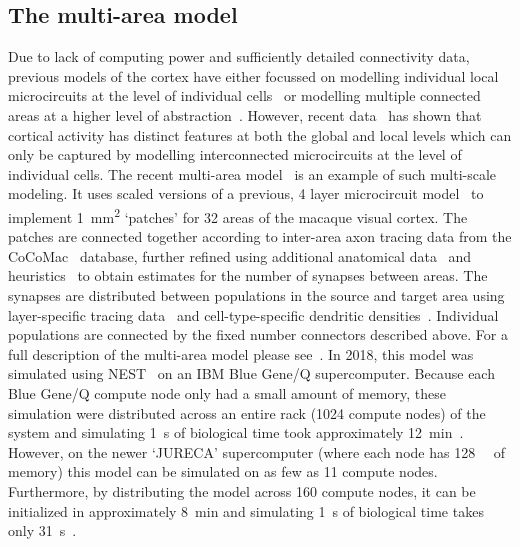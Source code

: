 \documentclass[9pt,a4paper]{amsart}
\begin{document}
\subsection{The multi-area model}
Due to lack of computing power and sufficiently detailed connectivity data, previous models of the cortex have either focussed on modelling individual local microcircuits at the level of individual cells~\citep{Izhikevich2008,Potjans2012} or modelling multiple connected areas at a higher level of abstraction~\citep{Cabral2014}.
However, recent data~\citep{Belitski2008} has shown that cortical activity has distinct features at both the global and local levels which can only be captured by modelling interconnected microcircuits at the level of individual cells.
The recent multi-area model~\citep{Schmidt2018a,Schmidt2018} is an example of such multi-scale modeling.
It uses scaled versions of a previous, 4 layer microcircuit model~\citep{Potjans2012} to implement \SI{1}{\milli\meter\squared} `patches' for 32 areas of the macaque visual cortex.
The patches are connected together according to inter-area axon tracing data from the CoCoMac~\citep{Bakker2012} database, further refined using additional anatomical data~\citep{Markov2014} and heuristics~\citep{Ercsey-Ravasz2013} to obtain estimates for the number of synapses between areas.
The synapses are distributed between populations in the source and target area using layer-specific tracing data~\citep{Markov2014b} and cell-type-specific dendritic densities~\citep{Binzegger2004}.
Individual populations are connected by the fixed number connectors described above.
For a full description of the multi-area model please see~\citet{Schmidt2018a,Schmidt2018}.
In 2018, this model was simulated using NEST~\citep{Gewaltig2007} on an IBM Blue Gene/Q supercomputer.
Because each Blue Gene/Q compute node only had a small amount of memory, these simulation were distributed across an entire rack (\num{1024} compute nodes) of the system and simulating \SI{1}{\second} of biological time took approximately \SI{12}{\minute}~\citep{Schmidt2018}.
However, on the newer `JURECA' supercomputer (where each node has \SI{128}{\giga\byte} of memory) this model can be simulated on as few as \num{11} compute nodes.
Furthermore, by distributing the model across \num{160} compute nodes, it can be initialized in approximately \SI{8}{\minute} and simulating \SI{1}{\second} of biological time takes only \SI{31}{\second}~\citep{VanAlbada2020}.
\end{document}

